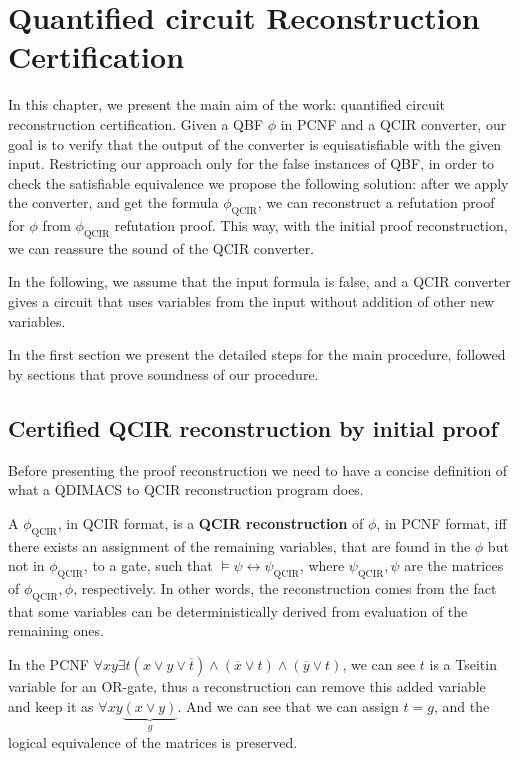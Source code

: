 \section{Quantified circuit Reconstruction Certification}

In this chapter, we present the main aim of the work: quantified circuit reconstruction certification. Given a QBF $\phi$ in PCNF and a QCIR converter, our goal is to verify that the output of the converter is equisatisfiable with the given input. Restricting our approach only for the false instances of QBF, in order to check the satisfiable equivalence we propose the following solution: after we apply the converter, and get the formula $\phi_\text{QCIR}$, we can reconstruct a refutation proof for $\phi$ from $\phi_\text{QCIR}$ refutation proof. This way, with the initial proof reconstruction, we can reassure the sound of the QCIR converter.

In the following, we assume that the input formula is false, and a QCIR converter gives a circuit that uses variables from the input without addition of other new variables.

In the first section we present the detailed steps for the main procedure, followed by sections that prove soundness of our procedure.

\subsection{Certified QCIR reconstruction by initial proof}

Before presenting the proof reconstruction we need to have a concise definition of what a QDIMACS to QCIR reconstruction program does.

\begin{definition}\label{qcir:recon}
    A $\phi_\text{QCIR}$, in QCIR format, is a \textbf{QCIR reconstruction} of $\phi$, in PCNF format, iff there exists an assignment of the remaining variables, that are found in the $\phi$ but not in $\phi_\text{QCIR}$, to a gate, such that $\models \psi \leftrightarrow \psi_\text{QCIR}$, where $\psi_\text{QCIR}, \psi$ are the matrices of $\phi_\text{QCIR}, \phi$, respectively. In other words, the reconstruction comes from the fact that some variables can be deterministically derived from evaluation of the remaining ones.
\end{definition}

\begin{example}
    In the PCNF $\forall x y \exists t (x \lor y \lor \overline{t}) \land (\overline{x} \lor t) \land (\overline{y} \lor t)$, we can see $t$ is a Tseitin variable for an OR-gate, thus a reconstruction can remove this added variable and keep it as $\forall x y \underbrace{(x \lor y)}_g$. And we can see that we can assign $t = g$, and the logical equivalence of the matrices is preserved.
\end{example}

